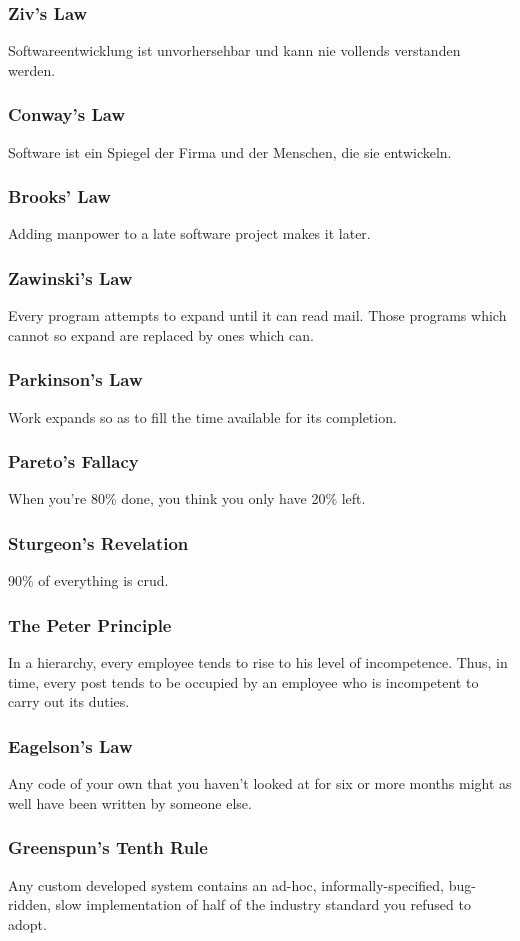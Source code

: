 \subsubsection{Ziv's Law}
Softwareentwicklung ist unvorhersehbar und kann nie vollends verstanden werden.
\subsubsection{Conway's Law}
Software ist ein Spiegel der Firma und der Menschen, die sie entwickeln.
\subsubsection{Brooks' Law}
Adding manpower to a late software project makes it later.
\subsubsection{Zawinski's Law}
Every program attempts to expand until it can read mail. Those programs which cannot so expand are replaced by ones which can.
\subsubsection{Parkinson's Law}
Work expands so as to fill the time available for its completion.
\subsubsection{Pareto's Fallacy}
When you're 80\% done, you think you  only have 20\% left.
\subsubsection{Sturgeon's Revelation}
90\% of everything is crud.
\subsubsection{The Peter Principle}
In a hierarchy, every employee tends to rise to his level of incompetence. Thus, in time, every post tends to be occupied by an employee who is incompetent to carry out its duties.
\subsubsection{Eagelson's Law}
Any code of your own that you haven't looked at for six or more months might as well have been written by someone else.
\subsubsection{Greenspun's Tenth Rule}
Any custom developed system contains an ad-hoc, informally-specified, bug-ridden, slow implementation of half of the industry standard you refused to adopt.
